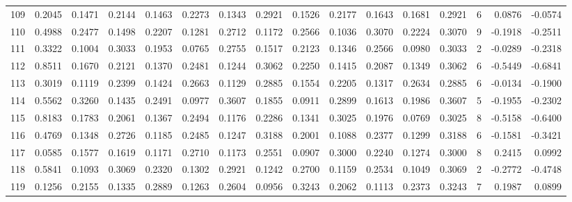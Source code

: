 \begin{tabular}{lrrrrrrrrrrrrrrr}
109 &      0.2045 &  0.1471 &  0.2144 &  0.1463 &  0.2273 &  0.1343 &  0.2921 &  0.1526 &  0.2177 &  0.1643 &   0.1681 &     0.2921 &      6 &                    0.0876 &                    -0.0574 \\
110 &      0.4988 &  0.2477 &  0.1498 &  0.2207 &  0.1281 &  0.2712 &  0.1172 &  0.2566 &  0.1036 &  0.3070 &   0.2224 &     0.3070 &      9 &                   -0.1918 &                    -0.2511 \\
111 &      0.3322 &  0.1004 &  0.3033 &  0.1953 &  0.0765 &  0.2755 &  0.1517 &  0.2123 &  0.1346 &  0.2566 &   0.0980 &     0.3033 &      2 &                   -0.0289 &                    -0.2318 \\
112 &      0.8511 &  0.1670 &  0.2121 &  0.1370 &  0.2481 &  0.1244 &  0.3062 &  0.2250 &  0.1415 &  0.2087 &   0.1349 &     0.3062 &      6 &                   -0.5449 &                    -0.6841 \\
113 &      0.3019 &  0.1119 &  0.2399 &  0.1424 &  0.2663 &  0.1129 &  0.2885 &  0.1554 &  0.2205 &  0.1317 &   0.2634 &     0.2885 &      6 &                   -0.0134 &                    -0.1900 \\
114 &      0.5562 &  0.3260 &  0.1435 &  0.2491 &  0.0977 &  0.3607 &  0.1855 &  0.0911 &  0.2899 &  0.1613 &   0.1986 &     0.3607 &      5 &                   -0.1955 &                    -0.2302 \\
115 &      0.8183 &  0.1783 &  0.2061 &  0.1367 &  0.2494 &  0.1176 &  0.2286 &  0.1341 &  0.3025 &  0.1976 &   0.0769 &     0.3025 &      8 &                   -0.5158 &                    -0.6400 \\
116 &      0.4769 &  0.1348 &  0.2726 &  0.1185 &  0.2485 &  0.1247 &  0.3188 &  0.2001 &  0.1088 &  0.2377 &   0.1299 &     0.3188 &      6 &                   -0.1581 &                    -0.3421 \\
117 &      0.0585 &  0.1577 &  0.1619 &  0.1171 &  0.2710 &  0.1173 &  0.2551 &  0.0907 &  0.3000 &  0.2240 &   0.1274 &     0.3000 &      8 &                    0.2415 &                     0.0992 \\
118 &      0.5841 &  0.1093 &  0.3069 &  0.2320 &  0.1302 &  0.2921 &  0.1242 &  0.2700 &  0.1159 &  0.2534 &   0.1049 &     0.3069 &      2 &                   -0.2772 &                    -0.4748 \\
119 &      0.1256 &  0.2155 &  0.1335 &  0.2889 &  0.1263 &  0.2604 &  0.0956 &  0.3243 &  0.2062 &  0.1113 &   0.2373 &     0.3243 &      7 &                    0.1987 &                     0.0899 \\

\end{tabular}
